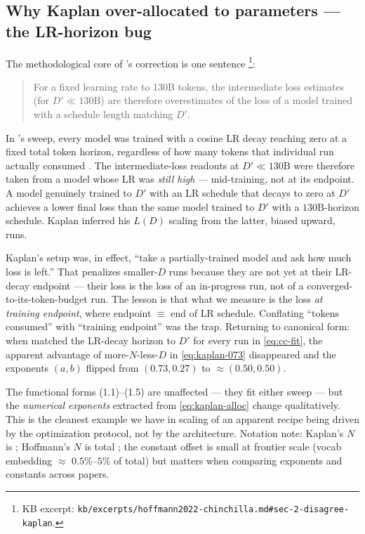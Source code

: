 \subsection{Why Kaplan over-allocated to parameters --- the LR-horizon bug}
\label{sec:scaling-lrhorizon}

The methodological core of \citeauthor{hoffmann2022-chinchilla}'s
correction is one sentence \citep[\S 2]{hoffmann2022-chinchilla}\footnote{KB
excerpt: \texttt{kb/excerpts/hoffmann2022-chinchilla.md\#sec-2-disagree-kaplan}.}:

\begin{quote}
For a fixed learning rate  to 130B tokens, the
intermediate loss estimates (for $D' \ll 130\text{B}$) are therefore
overestimates of the loss of a model trained with a schedule length
matching $D'$.
\end{quote}

In \citet{kaplan2020}'s sweep, every model was trained with a cosine
LR decay reaching zero at a fixed total token horizon, regardless of
how many tokens that individual run actually consumed
\citep[\S 2.2]{kaplan2020}. The intermediate-loss readouts at $D'
\ll 130\text{B}$ were therefore taken from a model whose LR was
\emph{still high} --- mid-training, not at its endpoint. A model
genuinely trained to $D'$ with an LR schedule that decays to zero at
$D'$ achieves a lower final loss than the same model trained to $D'$
with a $130\text{B}$-horizon schedule. Kaplan inferred his $L(D)$
scaling from the latter, biased upward, runs.

\begin{intuition}
Kaplan's setup was, in effect, ``take a partially-trained model and
ask how much loss is left.'' That penalizes smaller-$D$ runs because
they are not yet at their LR-decay endpoint --- their loss is the
loss of an in-progress run, not of a converged-to-its-token-budget
run. The lesson is that what we measure is the loss \emph{at training
endpoint}, where endpoint $\equiv$ end of LR schedule. Conflating
``tokens consumed'' with ``training endpoint'' was the trap. Returning
to canonical form: when \citet{hoffmann2022-chinchilla} matched the
LR-decay horizon to $D'$ for every run in
\cref{eq:cc-fit}, the apparent advantage of more-$N$-less-$D$ in
\cref{eq:kaplan-073} disappeared and the exponents $(a, b)$ flipped
from $(0.73, 0.27)$ to $\approx (0.50, 0.50)$.
\end{intuition}

The functional forms (1.1)--(1.5) are unaffected --- they fit either
sweep --- but the \emph{numerical exponents} extracted from
\cref{eq:kaplan-alloc} change qualitatively. This is the cleanest
example we have in  scaling of an apparent recipe being driven by
the optimization protocol, not by the architecture. Notation note:
Kaplan's $N$ is 
\citep[\S 1.3]{kaplan2020}; Hoffmann's $N$ is total ; the
constant offset is small at frontier scale (vocab embedding $\approx$
$0.5\%$--$5\%$ of total) but matters when comparing exponents and
constants across papers.

